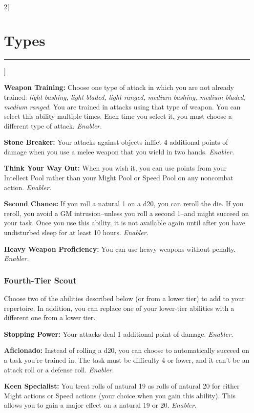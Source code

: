 \documentclass[a4paper,10pt,final]{book}
\newcommand{\HRule}{\rule{\linewidth}{0.5mm}} %
\newcommand{\newSection}[1]{\section*{#1} \addcontentsline{toc}{section}{#1} \label{sec:#1} \HRule}
\newcommand{\itemAbility}[2]{\textcolor{25gray}{\textbullet\textbf{ #1:}} {#2}\par}
\newcommand{\enabler}{\textit{ Enabler.}}
\newenvironment{docsection}[1]
{
  \begin{multicols*}{2}[\newSection{#1}]
}
{
  \end{multicols*}
  \newpage
}
\begin{document}
\begin{docsection}{Types}
\itemAbility{Weapon Training}{Choose one type of attack in which you are not already trained: \textit{light bashing, light bladed, light ranged, medium bashing, medium bladed, medium ranged}. You are trained in attacks using that type of weapon. You can select this ability multiple times. Each time you select it, you must choose a different type of attack.\enabler}

\itemAbility{Stone Breaker}{Your attacks against objects inflict 4 additional points of damage when you use a melee weapon that you wield in two hands.\enabler}

\itemAbility{Think Your Way Out}{When you wish it, you can use points from your Intellect Pool rather than your Might Pool or Speed Pool on any noncombat action.\enabler}

\itemAbility{Second Chance}{If you roll a natural 1 on a d20, you can reroll the die. If you reroll, you avoid a GM intrusion--unless you roll a second 1--and might succeed on your task. Once you use this ability, it is not available again until after you have undisturbed sleep for at least 10 hours.\enabler}

\itemAbility{Heavy Weapon Proficiency}{You can use heavy weapons without penalty.\enabler}


\subsubsection*{Fourth-Tier Scout}
\label{subsub:scoutFourthTier}

Choose two of the abilities described
below (or from a lower tier) to add to your
repertoire. In addition, you can replace one
of your lower-tier abilities with a different
one from a lower tier.

\itemAbility{Stopping Power}{Your attacks deal 1 additional point of damage.\enabler}

\itemAbility{Aficionado}{Instead of rolling a d20, you can choose to automatically succeed on a task you’re trained in. The task must be difficulty 4 or lower, and it can’t be an attack roll or a defense roll.\enabler}

\itemAbility{Keen Specialist}{You treat rolls of natural 19 as rolls of natural 20 for either Might actions or Speed actions (your choice when you gain this ability). This allows you to gain a major effect on a natural 19 or 20.\enabler}


\end{docsection}
\end{document}
